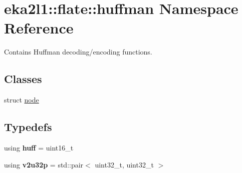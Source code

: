 \hypertarget{namespaceeka2l1_1_1flate_1_1huffman}{}\section{eka2l1\+:\+:flate\+:\+:huffman Namespace Reference}
\label{namespaceeka2l1_1_1flate_1_1huffman}


Contains Huffman decoding/encoding functions.  


\subsection*{Classes}
\begin{DoxyCompactItemize}
\item 
struct \mbox{\hyperlink{structeka2l1_1_1flate_1_1huffman_1_1node}{node}}
\end{DoxyCompactItemize}
\subsection*{Typedefs}
\begin{DoxyCompactItemize}
\item 
\mbox{\label{namespaceeka2l1_1_1flate_1_1huffman_ab8d70c9e082fb2c34d230e87ef671ca3}} 
using {\bfseries huff} = uint16\+\_\+t
\item 
\mbox{\label{namespaceeka2l1_1_1flate_1_1huffman_aee825c81f89056b12d08fbfb4fda840f}} 
using {\bfseries v2u32p} = std\+::pair$<$ uint32\+\_\+t, uint32\+\_\+t $>$
\end{DoxyCompactItemize}
